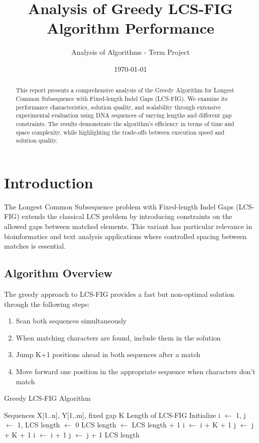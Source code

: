 \documentclass[11pt,a4paper]{article}
\title{Analysis of Greedy LCS-FIG Algorithm Performance}
\author{Analysis of Algorithms - Term Project}
\date{\today}
\begin{document}
\maketitle

\begin{abstract}
This report presents a comprehensive analysis of the Greedy Algorithm for Longest Common Subsequence with Fixed-length Indel Gaps (LCS-FIG). We examine its performance characteristics, solution quality, and scalability through extensive experimental evaluation using DNA sequences of varying lengths and different gap constraints. The results demonstrate the algorithm's efficiency in terms of time and space complexity, while highlighting the trade-offs between execution speed and solution quality.
\end{abstract}

\section{Introduction}

The Longest Common Subsequence problem with Fixed-length Indel Gaps (LCS-FIG) extends the classical LCS problem by introducing constraints on the allowed gaps between matched elements. This variant has particular relevance in bioinformatics and text analysis applications where controlled spacing between matches is essential.

\subsection{Algorithm Overview}

The greedy approach to LCS-FIG provides a fast but non-optimal solution through the following steps:

\begin{enumerate}
    \item Scan both sequences simultaneously
    \item When matching characters are found, include them in the solution
    \item Jump K+1 positions ahead in both sequences after a match
    \item Move forward one position in the appropriate sequence when characters don't match
\end{enumerate}

\begin{algorithm}
\caption{Greedy LCS-FIG Algorithm}
\begin{algorithmic}[1]
\Require Sequences X[1..n], Y[1..m], fixed gap K
\Ensure Length of LCS-FIG
\State Initialize i $\gets$ 1, j $\gets$ 1, LCS length $\gets$ 0
        \State LCS length $\gets$ LCS length + 1
        \State i $\gets$ i + K + 1
        \State j $\gets$ j + K + 1
        \State i $\gets$ i + 1
    \Else
        \State j $\gets$ j + 1
    \EndIf
\EndWhile
\State \Return LCS length
\end{algorithmic}
\end{algorithm}
\end{document}
